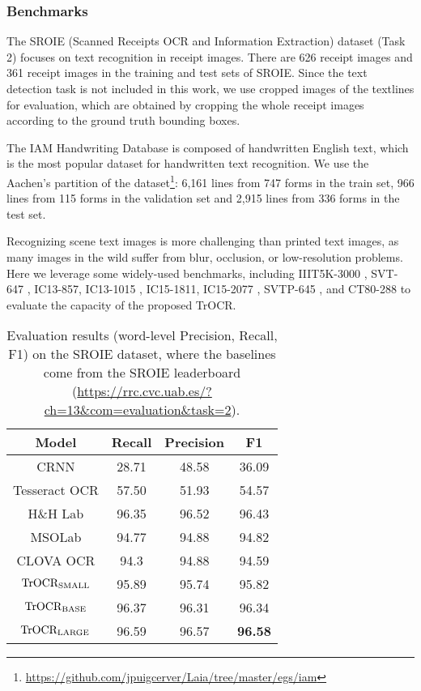 \documentclass[letterpaper]{article} \usepackage{aaai23}  \usepackage{times}  \usepackage{helvet}  \usepackage{courier}  \usepackage[hyphens]{url}  \usepackage{graphicx} \urlstyle{rm} \def\UrlFont{\rm}  \usepackage{natbib}  \usepackage{caption} \frenchspacing  \setlength{\pdfpagewidth}{8.5in} \setlength{\pdfpageheight}{11in} \usepackage{algorithm}
\begin{document}
\subsubsection{Benchmarks}
The SROIE (Scanned Receipts OCR and Information Extraction) dataset (Task 2) focuses on text recognition in receipt images.
There are 626 receipt images and 361 receipt images in the training and test sets of SROIE.
Since the text detection task is not included in this work, we use cropped images of the textlines for evaluation, which are obtained by cropping the whole receipt images according to the ground truth bounding boxes.

The IAM Handwriting Database is composed of handwritten English text, which is the most popular dataset for handwritten text recognition. We use the Aachen's partition of the dataset\footnote{\tiny\url{https://github.com/jpuigcerver/Laia/tree/master/egs/iam}}: 6,161 lines from 747 forms in the train set, 966 lines from 115 forms in the validation set and 2,915 lines from 336 forms in the test set.

Recognizing scene text images is more challenging than printed text images, as many images in the wild suffer from blur, occlusion, or low-resolution problems. Here we leverage some widely-used benchmarks, including IIIT5K-3000 \cite{mishra2012top}, SVT-647 \cite{wang2011end}, IC13-857, IC13-1015 \cite{karatzas2013icdar}, IC15-1811, IC15-2077 \cite{karatzas2015icdar}, SVTP-645 \cite{phan2013recognizing}, and CT80-288 \cite{risnumawan2014robust} to evaluate the capacity of the proposed TrOCR.



\begin{table}[ht]
\centering
\begin{tabular}{cccc}
\hline
\textbf{Model} & \textbf{Recall} & \textbf{Precision} & \textbf{F1} \\ \hline
CRNN            & 28.71              & 48.58          & 36.09         \\
Tesseract OCR   & 57.50              & 51.93           & 54.57       \\ \hline
H\&H Lab & 96.35           & 96.52              & 96.43       \\
MSOLab   & 94.77           & 94.88              & 94.82       \\
CLOVA OCR & 94.3            & 94.88              & 94.59       \\ \hline

$\textrm{TrOCR}_{\rm SMALL}$     & 95.89           & 95.74              & 95.82       \\
$\textrm{TrOCR}_{\rm BASE}$      & 96.37           & 96.31              & 96.34       \\
$\textrm{TrOCR}_{\rm LARGE}$     & 96.59           & 96.57              & \textbf{96.58}       \\
\hline
\end{tabular}
\caption{Evaluation results (word-level Precision, Recall, F1) on the SROIE dataset, where the baselines come from the SROIE leaderboard (\url{https://rrc.cvc.uab.es/?ch=13&com=evaluation&task=2}).}
\label{tab:sroie}
\end{table}
\end{document}
